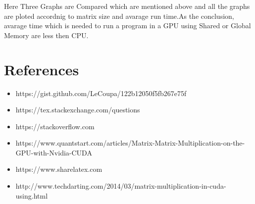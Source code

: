 \documentclass[12pt,oneside,a4paper]{article}
\begin{document}
	\par
	Here Three Graphs are Compared which are mentioned above and all the graphs are ploted accordnig to matrix size and avarage run time.As the conclusion, avarage time which is needed to run a program in a GPU using Shared or Global Memory are less then CPU.
	\hfill \break


	\newpage

	\section{References}

	\begin{itemize}
	  \item https://gist.github.com/LeCoupa/122b12050f5fb267e75f
	  \item https://tex.stackexchange.com/questions
          \item https://stackoverflow.com
          \item https://www.quantstart.com/articles/Matrix-Matrix-Multiplication-on-the-GPU-with-Nvidia-CUDA
          \item https://www.sharelatex.com
          \item http://www.techdarting.com/2014/03/matrix-multiplication-in-cuda-using.html

	\end{itemize}
\end{document}
